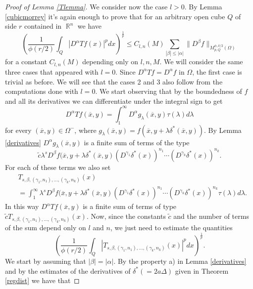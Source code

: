 \documentclass[12pt]{article}
\theoremstyle{definition}
\DeclareMathOperator\rr{\mathbb{R}}
\begin{document}
\begin{proof}[Proof of Lemma \ref{Tlemma}]
We consider now the case $l>0.$ By Lemma \ref{cubicmorrey} it's again enough to prove that for an arbitrary open cube $Q$ of side $r$ contained in $\rr^n$ we have
\begin{equation}
\left(\frac{1}{\phi(r/2)}\int_Q |D^\alpha Tf(x)|^pdx \right)^{\frac{1}{p}} \le C_{l,n}(M) \sum_{|\beta| \le |\alpha|}\| D^\beta f\|_{M_{p,Q}^{\phi,\delta/2}(\Omega)}
\end{equation}
for a constant $C_{l,n}(M)$ depending only on $l,n,M$. We will consider the same three cases that appeared with $l=0$. Since $D^\alpha Tf=D^\alpha f$ in $\Omega$, the first case is trivial as before. We will see that the cases 2 and 3 also follow from the computations done with $l=0$. We start observing that by the boundedness of $f$ and all its derivatives we can differentiate under the integral sign to get
\[D^\alpha Tf(\overline x,y)= \int_1^\infty D^\alpha g_\lambda(\overline x,y) \tau(\lambda) d\lambda\]
for every $(\overline x, y) \in \Omega^-$, where $g_\lambda(\overline x,y)=f(\overline x, y+\lambda \delta^*(\overline x, y))$. By Lemma \ref{derivatives} $D^\alpha g_\lambda(\overline x,y)$ is a finite sum of terms of the type 
\[ \widetilde c\lambda ^s D^\beta f(\overline x, y+\lambda \delta^*(\overline x, y)(D^{\gamma_1}\delta^*(x))^{n_1}\cdots (D^{\gamma_k}\delta^*(x))^{n_k}.\]
For each of these terms we also set
\begin{align*}
 &T_{s,\beta,(\gamma_1,n_1),...,(\gamma_k,n_k)}(x) \\
 &= \int_1^\infty \lambda ^s D^\beta f(\overline x, y+\lambda \delta^*(\overline x, y)(D^{\gamma_1}\delta^*(x))^{n_1}\cdots (D^{\gamma_k}\delta^*(x))^{n_k} \tau(\lambda) d\lambda.
 \end{align*}
In this way $D^\alpha Tf(\overline x,y)$ is a finite sum of terms of type $\widetilde c T_{s,\beta,(\gamma_1,n_1),...,(\gamma_k,n_k)}(x)$. Now, since the constants $\widetilde c$ and the number of terms of the sum depend only on $l$ and $n$, we just need to estimate the quantities
\[\left( \frac{1}{\phi(r/2)}\int_Q  \left| T_{s,\beta,(\gamma_1,n_1),...,(\gamma_k,n_k)}(x)\right|^p dx\right )^{\frac{1}{p}}.\]
We start by assuming that $|\beta|=|\alpha|.$ By the property a) in Lemma \ref{derivatives} and by the estimates of the derivatives of $\delta^*(=2a\Delta)$ given in Theorem \ref{regdist} we have that


\end{proof}
\end{document}
